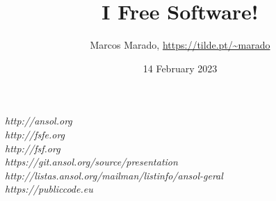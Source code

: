 \documentclass[landscape]{slides}
\author{Marcos Marado, \url{https://tilde.pt/~marado}}
\title{I \heart Free Software!}
\date{14 February 2023}
\begin{document}

\begin{slide}
\maketitle
\end{slide}



\begin{slide}

\emph{http://ansol.org} \\
\emph{http://fsfe.org} \\
\emph{http://fsf.org} \\
\emph{https://git.ansol.org/source/presentation} \\
\emph{http://listas.ansol.org/mailman/listinfo/ansol-geral} \\
\emph{https://publiccode.eu}
\end{slide}
\end{document}
